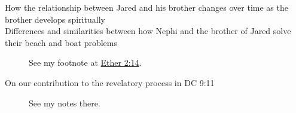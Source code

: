 \begin{description}
		\item[How the relationship between Jared and his brother changes over time as the brother develops spiritually]
	
		\item[Differences and similarities between how Nephi and the brother of Jared solve their beach and boat problems]
			See my footnote at \hyperref[ETHER-2-14]{Ether 2:14}.
			
		\item[On our contribution to the revelatory process in DC 9:11]
			See my notes there.
	
	\end{description}